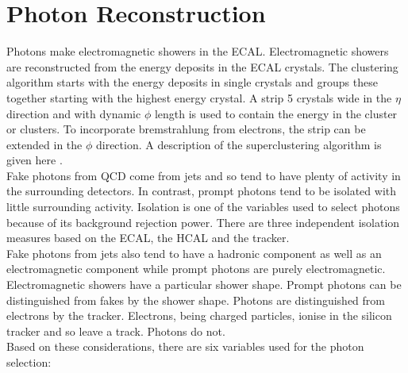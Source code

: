 \section{Photon Reconstruction}

Photons make electromagnetic showers in the ECAL. Electromagnetic showers are 
reconstructed from the energy deposits in the ECAL crystals. The clustering 
algorithm starts with the energy deposits in single crystals and groups these 
together starting with the highest energy crystal. A strip 5 crystals wide in 
the $\eta$ direction and with dynamic $\phi$ length is used to contain the 
energy in the cluster or clusters. To incorporate bremstrahlung from electrons, 
the strip can be extended in the $\phi$ direction. A description of the
superclustering algorithm is given here \cite{supercluster}. \\ 

Fake photons from QCD come from jets and so tend to have plenty of activity in
the surrounding detectors. In contrast, prompt photons tend to be isolated with
little surrounding activity. Isolation is one of the variables used to select 
photons because of its background rejection power. There are three independent 
isolation measures based on the ECAL, the HCAL and the tracker. \\

Fake photons from jets also tend to have a hadronic component as well as an
electromagnetic component while prompt photons are purely electromagnetic.
Electromagnetic showers have a particular shower shape. Prompt photons can be 
distinguished from fakes by the shower shape. Photons are distinguished from 
electrons by the tracker. Electrons, being charged particles, ionise in the 
silicon tracker and so leave a track. Photons do not. \\ 

Based on these considerations, there are six variables used for the photon 
selection:

